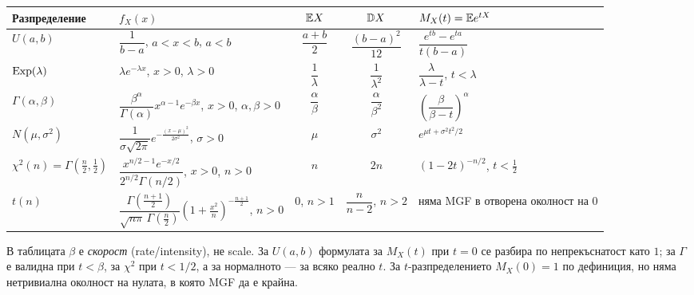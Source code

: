\begin{center}
\footnotesize
\setlength{\tabcolsep}{4pt}
\begin{tabular}{@{}llccl@{}}
\toprule
\textbf{Разпределение} & $f_X(x)$ & $\mathbb{E} X$ & $\mathbb{D} X$ & $M_X(t) = \mathbb{E} e^{tX}$ \\
\midrule
$U(a,b)$ & $\dfrac{1}{b-a}$, $a<x<b$, $a<b$ & $\dfrac{a+b}{2}$ & $\dfrac{(b-a)^2}{12}$ & $\dfrac{e^{tb}-e^{ta}}{t(b-a)}$ \\[7pt]
$\operatorname{Exp}(\lambda)$ & $\lambda e^{-\lambda x}$, $x>0$, $\lambda>0$ & $\dfrac{1}{\lambda}$ & $\dfrac{1}{\lambda^2}$ & $\dfrac{\lambda}{\lambda-t}$, $t<\lambda$ \\[7pt]
$\Gamma(\alpha,\beta)$ & $\dfrac{\beta^\alpha}{\Gamma(\alpha)} x^{\alpha-1} e^{-\beta x}$, $x>0$, $\alpha,\beta>0$ & $\dfrac{\alpha}{\beta}$ & $\dfrac{\alpha}{\beta^2}$ & $\left(\dfrac{\beta}{\beta-t}\right)^{\!\alpha}$ \\[7pt]
$N(\mu,\sigma^2)$ & $\dfrac{1}{\sigma\sqrt{2\pi}} e^{-\frac{(x-\mu)^2}{2\sigma^2}}$, $\sigma>0$ & $\mu$ & $\sigma^2$ & $e^{\mu t + \sigma^2 t^2/2}$ \\[7pt]
$\chi^2(n) = \Gamma\!\left(\frac{n}{2},\frac12\right)$ & $\dfrac{x^{n/2-1}e^{-x/2}}{2^{n/2}\Gamma(n/2)}$, $x>0$, $n>0$ & $n$ & $2n$ & $(1-2t)^{-n/2}$, $t<\tfrac12$ \\[7pt]
$t(n)$ & $\dfrac{\Gamma(\frac{n+1}{2})}{\sqrt{n\pi}\,\Gamma(\frac{n}{2})}\left(1+\frac{x^2}{n}\right)^{-\frac{n+1}{2}}$, $n>0$ & $0$, $n>1$ & $\dfrac{n}{n-2}$, $n>2$ & няма MGF в отворена околност на $0$ \\
\bottomrule
\end{tabular}
\end{center}

\noindent
В таблицата $\beta$ е \emph{скорост} (rate/intensity), не scale. За $U(a,b)$
формулата за $M_X(t)$ при $t=0$ се разбира по непрекъснатост като $1$;
за $\Gamma$ е валидна при $t<\beta$, за $\chi^2$ при $t<1/2$, а за
нормалното — за всяко реално $t$. За $t$-разпределението $M_X(0)=1$ по
дефиниция, но няма нетривиална околност на нулата, в която MGF да е крайна.

